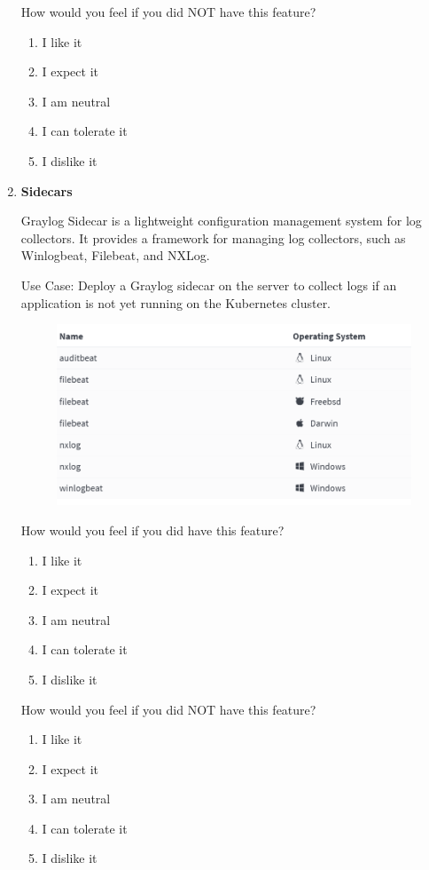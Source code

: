 \documentclass[../main.tex]{subfiles}
\begin{document}
\begin{enumerate}
    How would you feel if you did NOT have this feature?
    \begin{enumerate}
        \item I like it
        \item I expect it
        \item  I am neutral
        \item I can tolerate it
        \item I dislike it
    \end{enumerate}

    \clearpage
    \item \textbf{Sidecars}
    
    Graylog Sidecar is a lightweight configuration management system for log collectors. It provides a framework for managing log collectors, such as Winlogbeat, Filebeat, and NXLog. 
    
    Use Case: Deploy a Graylog sidecar on the server to collect logs if an application is not yet running on the Kubernetes cluster.

    \begin{figure}[H]
        \centering
        \includegraphics[scale=0.8]{img/10-appendix/sidecar_collectors.png}
        \label{fig:sidecar_collectors}
    \end{figure}

    How would you feel if you did have this feature?
    \begin{enumerate}
        \item I like it
        \item I expect it
        \item  I am neutral
        \item I can tolerate it
        \item I dislike it
    \end{enumerate}

    How would you feel if you did NOT have this feature?
    \begin{enumerate}
        \item I like it
        \item I expect it
        \item  I am neutral
        \item I can tolerate it
        \item I dislike it
    \end{enumerate}


\end{enumerate}
\end{document}
